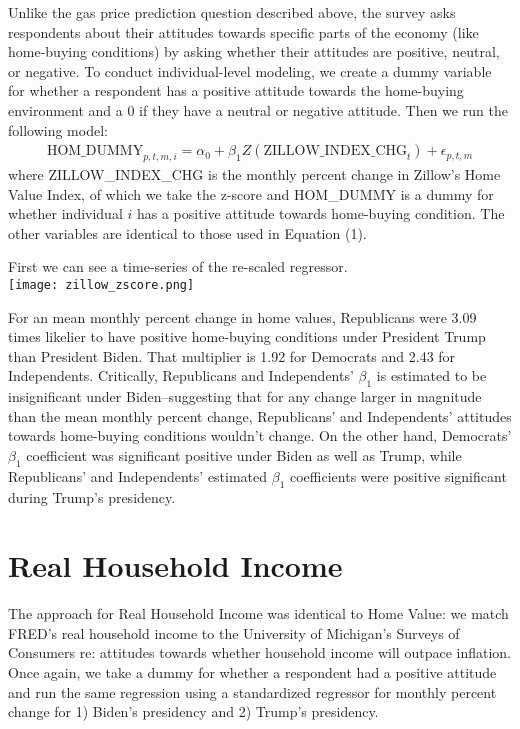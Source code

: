 \documentclass{article}
\begin{document}
Unlike the gas price prediction question described above, the survey asks respondents about their attitudes towards specific parts of the economy (like home-buying conditions) by asking whether their attitudes are positive, neutral, or negative. To conduct individual-level modeling, we create a dummy variable for whether a respondent has a positive attitude towards the home-buying environment and a 0 if they have a neutral or negative attitude. Then we run the following model:
\begin{gather} 
	\text{HOM\_DUMMY}_{p,t,m,i} = \alpha_0 + \beta_1 Z(\text{ZILLOW\_INDEX\_CHG}_{t}) + \epsilon_{p,t,m}
\end{gather} 
where ZILLOW\_INDEX\_CHG is the monthly percent change in Zillow's Home Value Index, of which we take the z-score and HOM\_DUMMY is a dummy for whether individual $i$ has a positive attitude towards home-buying condition. The other variables are identical to those used in Equation (1). 

First we can see a time-series of the re-scaled regressor. \\
\centering \texttt{[image: zillow\_zscore.png]}

\raggedright For an mean monthly percent change in home values, Republicans were 3.09 times likelier to have positive home-buying conditions under President Trump than President Biden. That multiplier is 1.92 for Democrats and 2.43 for Independents. Critically, Republicans and Independents' $\beta_1$ is estimated to be insignificant under Biden--suggesting that for any change larger in magnitude than the mean monthly percent change, Republicans' and Independents' attitudes towards home-buying conditions wouldn't change. On the other hand, Democrats' $\beta_1$ coefficient was significant positive under Biden as well as Trump, while Republicans' and Independents' estimated $\beta_1$ coefficients were positive significant during Trump's presidency.

\section{Real Household Income}

The approach for Real Household Income was identical to Home Value: we match FRED's real household income to the University of Michigan's Surveys of Consumers re: attitudes towards whether household income will outpace inflation. Once again, we take a dummy for whether a respondent had a positive attitude and run the same regression using a standardized regressor for monthly percent change for 1) Biden's presidency and 2) Trump's presidency. 
\end{document}

